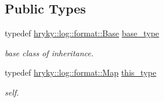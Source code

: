 \subsection*{Public Types}
\begin{DoxyCompactItemize}
\item 
\hypertarget{classhryky_1_1log_1_1format_1_1_map_a98b112d4ec1af244ceeb1a4d587f3a70}{typedef \hyperlink{classhryky_1_1log_1_1format_1_1_base}{hryky\-::log\-::format\-::\-Base} \hyperlink{classhryky_1_1log_1_1format_1_1_map_a98b112d4ec1af244ceeb1a4d587f3a70}{base\-\_\-type}}\label{classhryky_1_1log_1_1format_1_1_map_a98b112d4ec1af244ceeb1a4d587f3a70}

\begin{DoxyCompactList}\small\item\em base class of inheritance. \end{DoxyCompactList}\item 
\hypertarget{classhryky_1_1log_1_1format_1_1_map_aa8c4d7177f1bfdd9581aa603f3a0d29c}{typedef \hyperlink{classhryky_1_1log_1_1format_1_1_map}{hryky\-::log\-::format\-::\-Map} \hyperlink{classhryky_1_1log_1_1format_1_1_map_aa8c4d7177f1bfdd9581aa603f3a0d29c}{this\-\_\-type}}\label{classhryky_1_1log_1_1format_1_1_map_aa8c4d7177f1bfdd9581aa603f3a0d29c}

\begin{DoxyCompactList}\small\item\em self. \end{DoxyCompactList}\end{DoxyCompactItemize}
